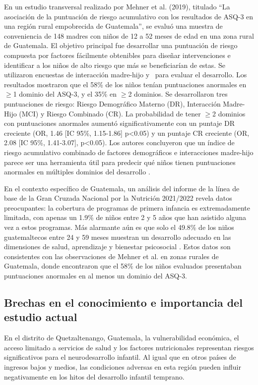 En un estudio transversal realizado por Mehner et al. (2019), titulado
``La asociación de la puntuación de riesgo acumulativo con los resultados de
ASQ-3 en una región rural empobrecida de Guatemala'', se evaluó una muestra de
conveniencia de 148 madres con niños de 12 a 52 meses de edad en una zona rural
de Guatemala. El objetivo principal fue desarrollar una puntuación de riesgo
compuesta por factores fácilmente obtenibles para diseñar intervenciones e
identificar a los niños de alto riesgo que más se beneficiarían de estas. Se
utilizaron encuestas de interacción madre-hijo y \asq\ para evaluar el
desarrollo. Los resultados mostraron que el 58\% de los niños tenían
puntuaciones anormales en $\ge$1 dominio del ASQ-3, y el 35\% en $\ge$2
dominios. Se desarrollaron tres puntuaciones de riesgo: Riesgo Demográfico
Materno (DR), Interacción Madre-Hijo (MCI) y Riesgo Combinado (CR). La
probabilidad de tener $\ge$2 dominios con puntuaciones anormales aumentó
significativamente con un puntaje DR creciente (OR, 1.46 [IC 95\%, 1.15-1.86]
p<0.05) y un puntaje CR creciente (OR, 2.08 [IC 95\%, 1.41-3.07], p<0.05). Los
autores concluyeron que un índice de riesgo acumulativo combinado de factores
demográficos e interacciones madre-hijo parece ser una herramienta útil para
predecir qué niños tienen puntuaciones anormales en múltiples dominios del
desarrollo \cite{CMehner2019}.

En el contexto específico de Guatemala, un análisis del informe de la  línea de
base de la Gran Cruzada Nacional por la Nutrición 2021/2022 revela  datos
preocupantes: la cobertura de programas de primera infancia es extremadamente
limitada, con apenas un 1.9\% de niños entre 2 y 5 años que han asistido alguna
vez a estos programas. Más alarmante aún es que solo el 49.8\% de los niños
guatemaltecos entre 24 y 59 meses muestran un desarrollo adecuado  en las
dimensiones de salud, aprendizaje y bienestar psicosocial \cite{SESAN2022}.
Estos datos son consistentes con las observaciones de Mehner et al.
\cite{CMehner2019} en zonas rurales de Guatemala, donde encontraron que el 58\%
de los niños evaluados presentaban puntuaciones anormales en al menos un
dominio del ASQ-3.

\subsection{Brechas en el conocimiento e importancia del estudio actual}
En el distrito de Quetzaltenango, Guatemala, la vulnerabilidad económica, el
acceso limitado a servicios de salud y los factores nutricionales representan
riesgos significativos para el neurodesarrollo infantil. Al igual que en otros
países de ingresos bajos y medios, las condiciones adversas en esta región
pueden influir negativamente en los hitos del desarrollo infantil temprano.

